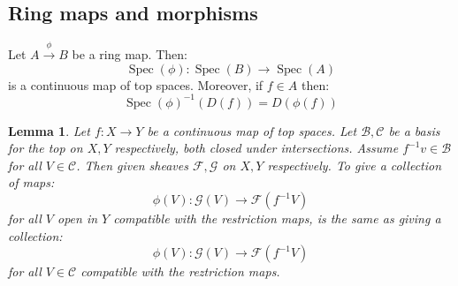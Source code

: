 \documentclass[12 pt]{article}
\DeclareMathOperator{\Spec}{Spec}
\theoremstyle{plain}
\newtheorem*{lem*}{Lemma}
\theoremstyle{definition}
\theoremstyle{remark}
\begin{document}
\subsection*{Ring maps and morphisms}
Let $A \xrightarrow{\phi} B$ be a ring map. Then:
\[   \Spec(\phi) : \Spec(B) \to \Spec(A) \]
is a continuous map of top spaces. Moreover, if $f\in A$ then:
\[        \Spec(\phi)^{-1} (D(f)) = D(\phi(f))      \]

\begin{lem*}
Let $f:X \to Y$ be a continuous map of top spaces. Let $\mathcal{B}, \mathcal{C}$ be a basis for the top on $X, Y$ respectively, both closed under intersections. Assume $f^{-1}v \in \mathcal{B}$ for all $V \in \mathcal{C}$. Then given sheaves $\mathcal{F}, \mathcal{G}$ on $X, Y$ respectively. To give a collection of maps:
\[       \phi(V) : \mathcal{G}(V) \to \mathcal{F}(f^{-1}V)      \]
for all $V$ open in $Y$ compatible with the restriction maps, is the same as giving a collection:
\[       \phi(V) : \mathcal{G}(V) \to \mathcal{F}(f^{-1}V)      \]
for all $V \in \mathcal{C}$ compatible with the reztriction maps.
\end{lem*}
\end{document}
